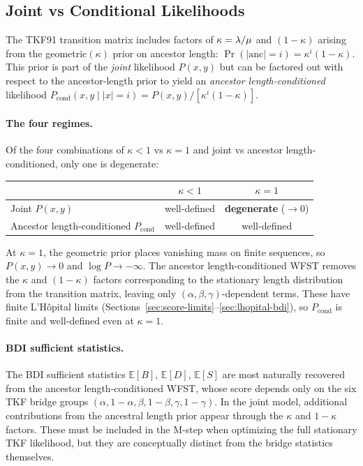 
\subsection{Joint vs Conditional Likelihoods}
\label{sec:joint-vs-conditional}

The TKF91 transition matrix includes factors of $\kappa = \lambda/\mu$
and $(1{-}\kappa)$ arising from the geometric$(\kappa)$ prior on
ancestor length: $\Pr(|\text{anc}| = i) = \kappa^i(1{-}\kappa)$.
This prior is part of the \emph{joint} likelihood $P(x,y)$
but can be factored out with respect to the ancestor-length prior to yield an \emph{ancestor length-conditioned} likelihood
$P_{\mathrm{cond}}(x,y \mid |x|=i)
= P(x,y) / [\kappa^i(1{-}\kappa)]$.

\paragraph{The four regimes.}
Of the four combinations of $\kappa < 1$ vs $\kappa = 1$
and joint vs ancestor length-conditioned, only one is degenerate:
\begin{center}
\begin{tabular}{lcc}
\toprule
& $\kappa < 1$ & $\kappa = 1$ \\
\midrule
Joint $P(x,y)$ & well-defined & \textbf{degenerate} ($\to 0$) \\
Ancestor length-conditioned $P_{\mathrm{cond}}$ & well-defined & well-defined \\
\bottomrule
\end{tabular}
\end{center}
At $\kappa = 1$, the geometric prior places vanishing mass on finite
sequences, so $P(x,y) \to 0$ and
$\log P \to -\infty$.
The ancestor length-conditioned WFST removes the $\kappa$ and $(1{-}\kappa)$
factors corresponding to the stationary length distribution from the transition matrix, leaving only
$(\alpha,\beta,\gamma)$-dependent terms.
These have finite L'H\^opital limits (Sections~\ref{sec:score-limits}--\ref{sec:lhopital-bdi}),
so $P_{\mathrm{cond}}$ is finite and well-defined even at $\kappa = 1$.

\paragraph{BDI sufficient statistics.}
The BDI sufficient statistics  $\mathbb{E}[B]$, $\mathbb{E}[D]$,
$\mathbb{E}[S]$ are most naturally recovered from the ancestor length-conditioned WFST, whose score depends only on the six TKF bridge groups 
$(\alpha, 1{-}\alpha, \beta, 1{-}\beta, \gamma, 1{-}\gamma)$. In the joint model, additional contributions from the ancestral length prior appear through the
$\kappa$ and $1{-}\kappa$ factors. These must be included in the M-step when optimizing the full stationary TKF likelihood, but they are conceptually distinct from the bridge statistics themselves.

